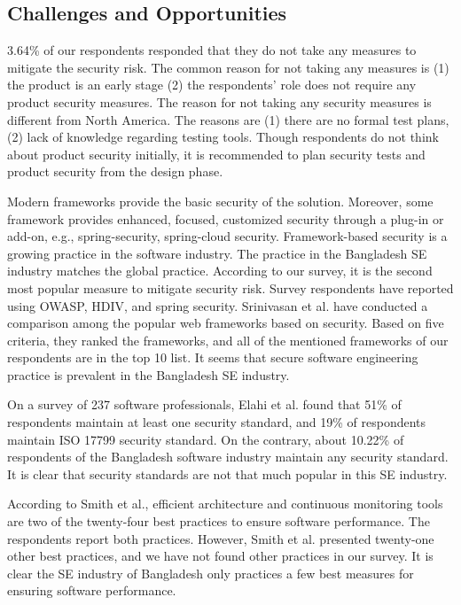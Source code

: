 \subsection{Challenges and Opportunities}
\label{dicussion challanges}
3.64\% of our respondents responded that they do not take any measures to mitigate the security risk. The common reason for not taking any measures is (1) the product is an early stage (2) the respondents' role does not require any product security measures. The reason for not taking any security measures is different from North America\cite{Assal2019}. The reasons are (1) there are no formal test plans, (2) lack of knowledge regarding testing tools. Though respondents do not think about product security initially, it is recommended\cite{Chandra2009,Azham2011} to plan security tests and product security from the design phase.

Modern frameworks provide the basic security of the solution. Moreover, some framework provides enhanced, focused, customized security through a plug-in or add-on, e.g., spring-security, spring-cloud security. Framework-based security is a growing practice in the software industry\cite{Alssir2012}. The practice in the Bangladesh SE industry matches the global practice. According to our survey, it is the second most popular measure to mitigate security risk. Survey respondents have reported using OWASP, HDIV, and spring security. Srinivasan et al.\cite{Srinivasan2017} have conducted a comparison among the popular web frameworks based on security. Based on five criteria, they ranked the frameworks, and all of the mentioned frameworks of our respondents are in the top 10 list. It seems that secure software engineering practice is prevalent in the Bangladesh SE industry.


On a survey of 237 software professionals, Elahi et al.\cite{Elahi2011} found that 51\% of respondents maintain at least one security standard, and 19\% of respondents maintain ISO 17799 security standard. On the contrary, about 10.22\% of respondents of the Bangladesh software industry maintain any security standard. It is clear that security standards are not that much popular in this SE industry.

According to Smith et al.\cite{Smith2003}, efficient architecture and continuous monitoring tools are two of the twenty-four best practices to ensure software performance. The respondents report both practices. However, Smith et al. presented twenty-one other best practices, and we have not found other practices in our survey. It is clear the SE industry of Bangladesh only practices a few best measures for ensuring software performance.

